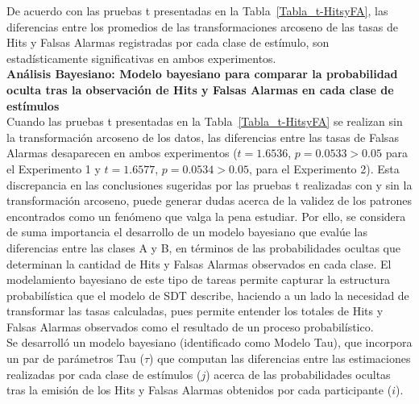De acuerdo con las pruebas t presentadas en la Tabla~\ref{Tabla_t-HitsyFA}, las diferencias entre los promedios de las transformaciones arcoseno de las tasas de Hits y Falsas Alarmas registradas por cada clase de estímulo, son estadísticamente significativas en ambos experimentos.\\

\textbf{Análisis Bayesiano: Modelo bayesiano para comparar la probabilidad oculta tras la observación de Hits y Falsas Alarmas en cada clase de estímulos}\\

Cuando las pruebas t presentadas en la Tabla~\ref{Tabla_t-HitsyFA} se realizan sin la transformación arcoseno de los datos, las diferencias entre las tasas de Falsas Alarmas desaparecen en ambos experimentos ($t=1.6536$, $p=0.0533>0.05$ para el Experimento 1 y $t=1.6577$, $p=0.0534>0.05$, para el Experimento 2). Esta discrepancia en las conclusiones sugeridas por las pruebas t realizadas con y sin la transformación arcoseno, puede generar dudas acerca de la validez de los patrones encontrados como un fenómeno que valga la pena estudiar. Por ello, se considera de suma importancia el desarrollo de un modelo bayesiano que evalúe las diferencias entre las clases A y B, en términos de las probabilidades ocultas que determinan la cantidad de Hits y Falsas Alarmas observados en cada clase. El modelamiento bayesiano de este tipo de tareas permite capturar la estructura probabilística que el modelo de SDT describe, haciendo a un lado la necesidad de transformar las tasas calculadas, pues permite entender los totales de Hits y Falsas Alarmas observados como el resultado de un proceso probabilístico.\\

Se desarrolló un modelo bayesiano (identificado como Modelo Tau), que incorpora un par de parámetros Tau ($\tau$) que computan las diferencias entre las estimaciones realizadas por cada clase de estímulos ($j$) acerca de las probabilidades ocultas tras la emisión de los Hits y Falsas Alarmas obtenidos por cada participante ($i$).\\ 

